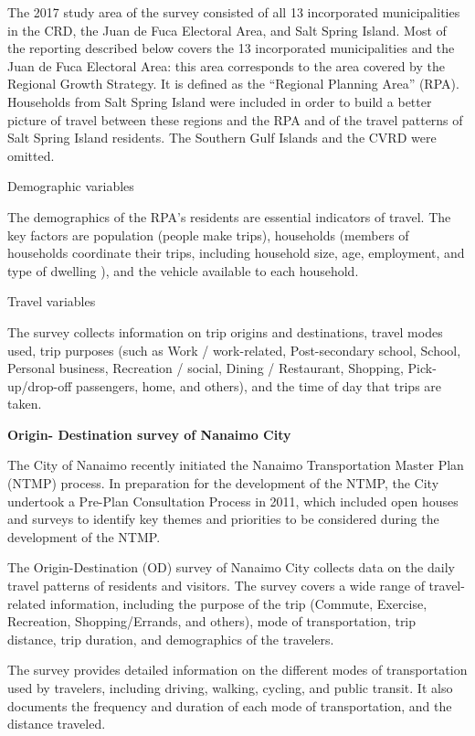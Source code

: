 \documentclass[
11pt, %
oneside, %
english, %
singlespacing, %
]{macthesis} %
\begin{document}
The 2017 study area of the survey consisted of all 13 incorporated municipalities in the CRD, the Juan de Fuca Electoral Area, and Salt Spring Island. Most of the reporting described below covers the 13 incorporated municipalities and the Juan de Fuca Electoral Area: this area corresponds to the area covered by the Regional Growth Strategy. It is defined as the ``Regional Planning Area'' (RPA). Households from Salt Spring Island were included in order to build a better picture of travel between these regions and the RPA and of the travel patterns of Salt Spring Island residents. The Southern Gulf Islands and the CVRD were omitted.

Demographic variables

The demographics of the RPA's residents are essential indicators of travel. The key factors are population (people make trips), households (members of households coordinate their trips, including household size, age, employment, and type of dwelling ), and the vehicle available to each household.

Travel variables

The survey collects information on trip origins and destinations, travel modes used, trip purposes (such as Work / work-related, Post-secondary school, School, Personal business, Recreation / social, Dining / Restaurant, Shopping, Pick-up/drop-off passengers, home, and others), and the time of day that trips are taken.

\textbf{Origin- Destination survey of Nanaimo City}

The City of Nanaimo recently initiated the Nanaimo Transportation Master Plan (NTMP) process. In preparation for the development of the NTMP, the City undertook a Pre-Plan Consultation Process in 2011, which included open houses and surveys to identify key themes and priorities to be considered during the development of the NTMP.

The Origin-Destination (OD) survey of Nanaimo City collects data on the daily travel patterns of residents and visitors. The survey covers a wide range of travel-related information, including the purpose of the trip (Commute, Exercise, Recreation, Shopping/Errands, and others), mode of transportation, trip distance, trip duration, and demographics of the travelers.

The survey provides detailed information on the different modes of transportation used by travelers, including driving, walking, cycling, and public transit. It also documents the frequency and duration of each mode of transportation, and the distance traveled.
\end{document}
